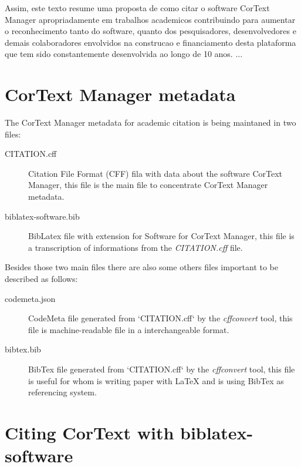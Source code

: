 \documentclass{article}
\begin{document}

Assim, este texto resume uma proposta de como citar o software CorText Manager
apropriadamente em trabalhos academicos contribuindo para aumentar o
reconhecimento tanto do software, quanto dos pesquisadores, desenvolvedores e
demais colaboradores envolvidos na construcao e financiamento desta plataforma
que tem sido constantemente desenvolvida ao longo de 10 anos. ...

\section{CorText Manager metadata}

The CorText Manager metadata for academic citation is being maintaned in two files:

\begin{description}
  \item[CITATION.cff] Citation File Format (CFF) fila with data about the software CorText Manager,
    this file is the main file to concentrate CorText Manager metadata.
  \item[biblatex-software.bib] BibLatex file with extension for Software for CorText Manager,
    this file is a transcription of informations from the {\em CITATION.cff} file.
\end{description}

Besides those two main files there are also some others files important to be described as follows:

\begin{description}
  \item[codemeta.json] CodeMeta file generated from `CITATION.cff` by the {\em cffconvert} tool,
    this file is machine-readable file in a interchangeable format.
  \item[bibtex.bib] BibTex file generated from `CITATION.cff` by the {\em cffconvert} tool,
    this file is useful for whom is writing paper with LaTeX and is using BibTex as referencing
    system.
\end{description}

\section{Citing CorText with biblatex-software}
\end{document}
